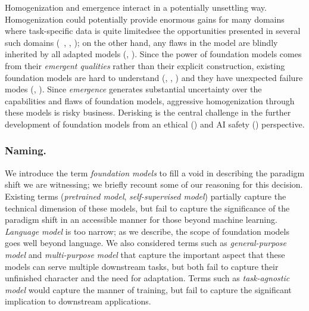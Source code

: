 Homogenization and emergence interact in a potentially unsettling way.
Homogenization could potentially provide enormous gains for many
domains where task-specific data is quite limited\dash{}see the  opportunities presented in several such domains (\eg~, , );
on the other hand, any flaws in the model are blindly inherited by all adapted models (, ).
Since the power of foundation models comes from their \emph{emergent qualities}
rather than their explicit construction,
existing foundation models are hard to understand (, , )
and they have unexpected failure modes (, ).
Since \emph{emergence} generates substantial uncertainty over the capabilities and flaws of foundation models,
aggressive homogenization through these models is risky business.
Derisking is the central challenge in the further development of foundation models
from an ethical () and AI safety () perspective.

\subsubsection{Naming.}
\label{sec:naming}

We introduce the term \textit{foundation models} to fill a void in describing the paradigm shift we are witnessing; we briefly recount some of our reasoning for this decision.
Existing terms (\eg \emph{pretrained model}, \emph{self-supervised model}) partially capture the technical dimension of these models,
but fail to capture the significance of the paradigm shift in an accessible manner for those beyond machine learning.
\emph{Language model} is too narrow; as we describe, the scope of foundation models goes well beyond language.
We also considered terms such as \emph{general-purpose model} and \emph{multi-purpose model} that capture the important aspect that these models can serve multiple downstream tasks,
but both fail to capture their unfinished character and the need for adaptation.
Terms such as \emph{task-agnostic model} would capture the manner of training, but fail to capture the significant implication to downstream applications.

